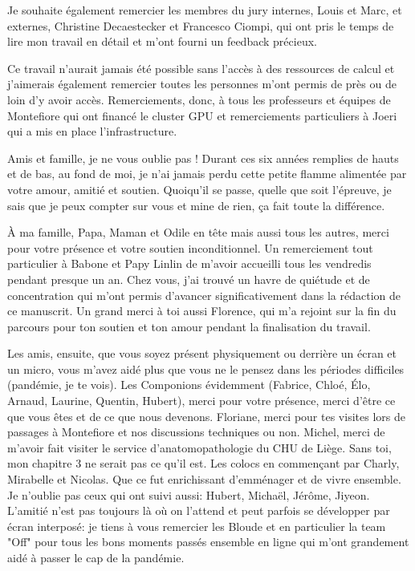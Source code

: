 \vspace{15pt}

Je souhaite également remercier les membres du jury internes, Louis et Marc, et externes, Christine Decaestecker et Francesco Ciompi, qui ont pris le temps de lire mon travail en détail et m'ont fourni un feedback précieux.

\vspace{15pt}

Ce travail n'aurait jamais été possible sans l'accès à des ressources de calcul et j'aimerais également remercier toutes les personnes m'ont permis de près ou de loin d'y avoir accès. Remerciements, donc, à tous les professeurs et équipes de Montefiore qui ont financé le cluster GPU et remerciements particuliers à Joeri qui a mis en place l'infrastructure.  

\vspace{15pt} 

Amis et famille, je ne vous oublie pas ! Durant ces six années remplies de hauts et de bas, au fond de moi, je n'ai jamais perdu cette petite flamme alimentée par votre amour, amitié et soutien. Quoiqu'il se passe, quelle que soit l'épreuve, je sais que je peux compter sur vous et mine de rien, ça fait toute la différence. 

À ma famille, Papa, Maman et Odile en tête mais aussi tous les autres, merci pour votre présence et votre soutien inconditionnel. Un remerciement tout particulier à Babone et Papy Linlin de m'avoir accueilli tous les vendredis pendant presque un an. Chez vous, j'ai trouvé un havre de quiétude et de concentration qui m'ont permis d'avancer significativement dans la rédaction de ce manuscrit. Un grand merci à toi aussi Florence, qui m'a rejoint sur la fin du parcours pour ton soutien et ton amour pendant la finalisation du travail. 

Les amis, ensuite, que vous soyez présent physiquement ou derrière un écran et un micro, vous m'avez aidé plus que vous ne le pensez dans les périodes difficiles (pandémie, je te vois). Les Componions évidemment (Fabrice, Chloé, Élo, Arnaud, Laurine, Quentin, Hubert), merci pour votre présence, merci d'être ce que vous êtes et de ce que nous devenons. Floriane, merci pour tes visites lors de passages à Montefiore et nos discussions techniques ou non. Michel, merci de m'avoir fait visiter le service d'anatomopathologie du CHU de Liège. Sans toi, mon chapitre 3 ne serait pas ce qu'il est. Les colocs en commençant par Charly, Mirabelle et Nicolas. Que ce fut enrichissant d'emménager et de vivre ensemble. Je n'oublie pas ceux qui ont suivi aussi: Hubert, Michaël, Jérôme, Jiyeon. L'amitié n'est pas toujours là où on l'attend et peut parfois se développer par écran interposé: je tiens à vous remercier les Bloude et en particulier la team "Off" pour tous les bons moments passés ensemble en ligne qui m'ont grandement aidé à passer le cap de la pandémie.


